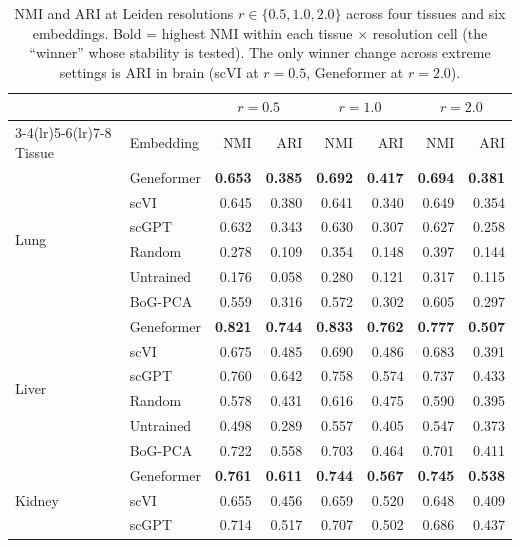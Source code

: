 \documentclass[10pt,letterpaper]{article}
\begin{document}
\begin{table}[h!]
\centering
\caption{NMI and ARI at Leiden resolutions $r \in \{0.5, 1.0, 2.0\}$ across four tissues and six embeddings. Bold = highest NMI within each tissue $\times$ resolution cell (the ``winner'' whose stability is tested). The only winner change across extreme settings is ARI in brain (scVI at $r=0.5$, Geneformer at $r=2.0$).}
\label{tab:app_leiden}
\scriptsize
\begin{tabular}{@{}ll rr rr rr@{}}
\toprule
 & & \multicolumn{2}{c}{$r = 0.5$} & \multicolumn{2}{c}{$r = 1.0$} & \multicolumn{2}{c}{$r = 2.0$} \\
\cmidrule(lr){3-4}\cmidrule(lr){5-6}\cmidrule(lr){7-8}
Tissue & Embedding & NMI & ARI & NMI & ARI & NMI & ARI \\
\midrule
\multirow{6}{*}{Lung}
 & Geneformer & \textbf{0.653} & \textbf{0.385} & \textbf{0.692} & \textbf{0.417} & \textbf{0.694} & \textbf{0.381} \\
 & scVI       & 0.645 & 0.380 & 0.641 & 0.340 & 0.649 & 0.354 \\
 & scGPT      & 0.632 & 0.343 & 0.630 & 0.307 & 0.627 & 0.258 \\
 & Random     & 0.278 & 0.109 & 0.354 & 0.148 & 0.397 & 0.144 \\
 & Untrained  & 0.176 & 0.058 & 0.280 & 0.121 & 0.317 & 0.115 \\
 & BoG-PCA    & 0.559 & 0.316 & 0.572 & 0.302 & 0.605 & 0.297 \\
\midrule
\multirow{6}{*}{Liver}
 & Geneformer & \textbf{0.821} & \textbf{0.744} & \textbf{0.833} & \textbf{0.762} & \textbf{0.777} & \textbf{0.507} \\
 & scVI       & 0.675 & 0.485 & 0.690 & 0.486 & 0.683 & 0.391 \\
 & scGPT      & 0.760 & 0.642 & 0.758 & 0.574 & 0.737 & 0.433 \\
 & Random     & 0.578 & 0.431 & 0.616 & 0.475 & 0.590 & 0.395 \\
 & Untrained  & 0.498 & 0.289 & 0.557 & 0.405 & 0.547 & 0.373 \\
 & BoG-PCA    & 0.722 & 0.558 & 0.703 & 0.464 & 0.701 & 0.411 \\
\midrule
\multirow{6}{*}{Kidney}
 & Geneformer & \textbf{0.761} & \textbf{0.611} & \textbf{0.744} & \textbf{0.567} & \textbf{0.745} & \textbf{0.538} \\
 & scVI       & 0.655 & 0.456 & 0.659 & 0.520 & 0.648 & 0.409 \\
 & scGPT      & 0.714 & 0.517 & 0.707 & 0.502 & 0.686 & 0.437 \\

\end{tabular}
\end{table}
\end{document}

